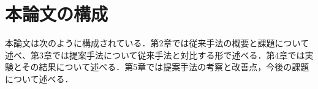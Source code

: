 \section{本論文の構成}

本論文は次のように構成されている．第2章では従来手法の概要と課題について述べ、第3章では提案手法について従来手法と対比する形で述べる．第4章では実験とその結果について述べる．第5章では提案手法の考察と改善点，今後の課題について述べる．	
